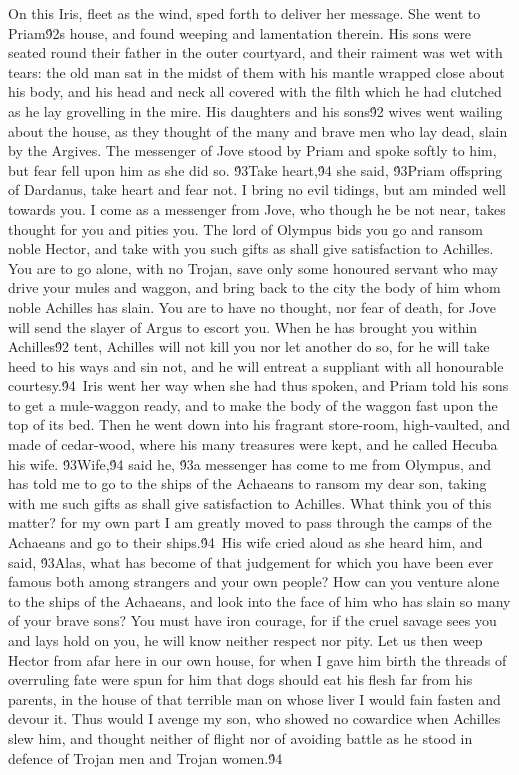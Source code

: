 {On this Iris, fleet as the wind, sped forth to deliver her message. She went to Priam\'92s house, and found weeping and lamentation therein. His sons were seated round their father in the outer courtyard, and their raiment was wet with tears: the old man sat in the midst of them with his mantle wrapped close about his body, and his head and neck all covered with the filth which he had clutched as he lay grovelling in the mire. His daughters and his sons\'92 wives went wailing about the house, as they thought of the many and brave men who lay dead, slain by the Argives. The messenger of Jove stood by Priam and spoke softly to him, but fear fell upon him as she did so. \'93Take heart,\'94 she said, \'93Priam offspring of Dardanus, take heart and fear not. I bring no evil tidings, but am minded well towards you. I come as a messenger from Jove, who though he be not near, takes thought for you and pities you. The lord of Olympus bids you go and ransom noble Hector, and take with you such gifts as shall give satisfaction to Achilles. You are to go alone, with no Trojan, save only some honoured servant who may drive your mules and waggon, and bring back to the city the body of him whom noble Achilles has slain. You are to have no thought, nor fear of death, for Jove will send the slayer of Argus to escort you. When he has brought you within Achilles\'92 tent, Achilles will not kill you nor let another do so, for he will take heed to his ways and sin not, and he will entreat a suppliant with all honourable courtesy.\'94\
Iris went her way when she had thus spoken, and Priam told his sons to get a mule-waggon ready, and to make the body of the waggon fast upon the top of its bed. Then he went down into his fragrant store-room, high-vaulted, and made of cedar-wood, where his many treasures were kept, and he called Hecuba his wife. \'93Wife,\'94 said he, \'93a messenger has come to me from Olympus, and has told me to go to the ships of the Achaeans to ransom my dear son, taking with me such gifts as shall give satisfaction to Achilles. What think you of this matter? for my own part I am greatly moved to pass through the camps of the Achaeans and go to their ships.\'94\
His wife cried aloud as she heard him, and said, \'93Alas, what has become of that judgement for which you have been ever famous both among strangers and your own people? How can you venture alone to the ships of the Achaeans, and look into the face of him who has slain so many of your brave sons? You must have iron courage, for if the cruel savage sees you and lays hold on you, he will know neither respect nor pity. Let us then weep Hector from afar here in our own house, for when I gave him birth the threads of overruling fate were spun for him that dogs should eat his flesh far from his parents, in the house of that terrible man on whose liver I would fain fasten and devour it. Thus would I avenge my son, who showed no cowardice when Achilles slew him, and thought neither of flight nor of avoiding battle as he stood in defence of Trojan men and Trojan women.\'94\
}
